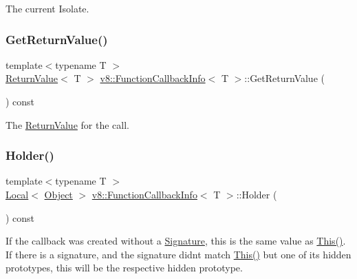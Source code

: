 The current Isolate. \mbox{\label{classv8_1_1FunctionCallbackInfo_a2cb41afe1e098a46d27d901b4cc1e6f5}} 
\subsubsection{\texorpdfstring{Get\+Return\+Value()}{GetReturnValue()}}
{\footnotesize\ttfamily template$<$typename T $>$ \\
\mbox{\hyperlink{classv8_1_1ReturnValue}{Return\+Value}}$<$ T $>$ \mbox{\hyperlink{classv8_1_1FunctionCallbackInfo}{v8\+::\+Function\+Callback\+Info}}$<$ T $>$\+::Get\+Return\+Value (\begin{DoxyParamCaption}{ }\end{DoxyParamCaption}) const}

The \mbox{\hyperlink{classv8_1_1ReturnValue}{Return\+Value}} for the call. \mbox{\label{classv8_1_1FunctionCallbackInfo_a708ab465862ed796e3b0b3c37ba05044}} 
\subsubsection{\texorpdfstring{Holder()}{Holder()}}
{\footnotesize\ttfamily template$<$typename T $>$ \\
\mbox{\hyperlink{classv8_1_1Local}{Local}}$<$ \mbox{\hyperlink{classv8_1_1Object}{Object}} $>$ \mbox{\hyperlink{classv8_1_1FunctionCallbackInfo}{v8\+::\+Function\+Callback\+Info}}$<$ T $>$\+::Holder (\begin{DoxyParamCaption}{ }\end{DoxyParamCaption}) const}

If the callback was created without a \mbox{\hyperlink{classv8_1_1Signature}{Signature}}, this is the same value as \mbox{\hyperlink{classv8_1_1FunctionCallbackInfo_a4ddfd6d21732dff1c4c55d5441a8a5ca}{This()}}. If there is a signature, and the signature didn\textquotesingle{}t match \mbox{\hyperlink{classv8_1_1FunctionCallbackInfo_a4ddfd6d21732dff1c4c55d5441a8a5ca}{This()}} but one of its hidden prototypes, this will be the respective hidden prototype.

